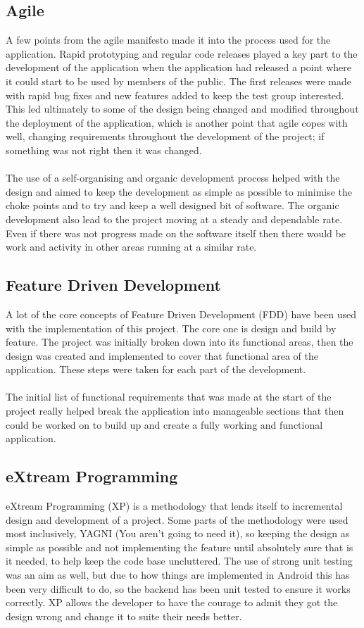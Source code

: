 \subsection{Agile}

A few points from the agile manifesto made it into the process used for the application. Rapid prototyping and regular code releases played a key part to the development of the application when the application had released a point where it could start to be used by members of the public. The first releases were made with rapid bug fixes and new features added to keep the test group interested. This led ultimately to some of the design being changed and modified throughout the deployment of the application, which is another point that agile copes with well, changing requirements throughout the development of the project; if something was not right then it was changed.\\
\\
The use of a self-organising and organic development process helped with the design and aimed to keep the development as simple as possible to minimise the choke points and to try and keep a well designed bit of software. The organic development also lead to the project moving at a steady and dependable rate. Even if there was not progress made on the software itself then there would be work and activity in other areas running at a similar rate.

\subsection{Feature Driven Development}

A lot of the core concepts of Feature Driven Development (FDD) have been used with the implementation of this project. The core one is design and build by feature. The project was initially broken down into its functional areas, then the design was created and implemented to cover that functional area of the application. These steps were taken for each part of the development.\\
\\
The initial list of functional requirements that was made at the start of the project really helped break the application into manageable sections that then could be worked on to build up and create a fully working and functional application.

\subsection{eXtream Programming}

eXtream Programming (XP) is a methodology that lends itself to incremental design and development of a project. Some parts of the methodology were used most inclusively, YAGNI (You aren't going to need it), so keeping the design as simple as possible and not implementing the feature until absolutely sure that is it needed, to help keep the code base uncluttered. The use of strong unit testing was an aim as well, but due to how things are implemented in Android this has been very difficult to do, so the backend has been unit tested to ensure it works correctly. XP allows the developer to have the courage to admit they got the design wrong and change it to suite their needs better.
